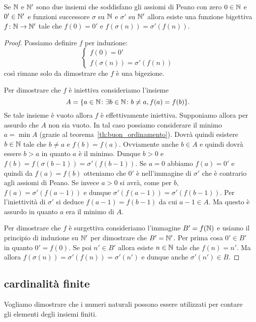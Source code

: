 \begin{theorem}
  \label{th:unicitaN}%
  Se ${\mathbb N}$ e ${\mathbb N}'$ sono due insiemi che soddisfano gli assiomi di Peano 
  con zero $0\in {\mathbb N}$ e $0'\in {\mathbb N}'$ e funzioni 
  successore $\sigma$ su ${\mathbb N}$ e $\sigma'$ su ${\mathbb N}'$ allora
  esiste una funzione bigettiva $f\colon {\mathbb N}\to {\mathbb N}'$ tale che 
  $f(0) = 0'$ e $f(\sigma(n)) = \sigma'(f(n))$.
\end{theorem}
%
\begin{proof}
Possiamo definire $f$ per induzione:
\[
\begin{cases}
  f(0) = 0' \\ 
  f(\sigma(n)) = \sigma'(f(n))
\end{cases}  
\]
così rimane solo da dimostrare che $f$ è una bigezione.

Per dimostrare che $f$ è iniettiva consideriamo l'insieme 
\[
  A={\left\{ a\in {\mathbb N}\colon \exists b\in {\mathbb N}\colon b\neq a, f(a)=f(b) \right\}}.
\]
Se tale insieme è vuoto allora $f$ è effettivamente iniettiva.
Supponiamo allora per assurdo che $A$ non sia vuoto.
In tal caso possiamo considerare il minimo $a=\min A$ 
(grazie al teorema~\ref{th:buon_ordinamento}).
Dovrà quindi esistere $b\in {\mathbb N}$ tale che $b\neq a$ e $f(b)=f(a)$.
Ovviamente anche $b\in A$ e quindi dovrà essere $b>a$ in quanto
$a$ è il minimo. Dunque $b>0$ e $f(b) = f(\sigma(b-1))
=\sigma'(f(b-1))$. Se $a=0$ abbiamo $f(a)=0'$ e quindi da $f(a)=f(b)$ 
otteniamo che $0'$ è nell'immagine di $\sigma'$ che è contrario 
agli assiomi di Peano. 
Se invece $a>0$ si avrà, come per $b$,
$f(a)=\sigma'(f(a-1))$ e dunque $\sigma'(f(a-1)) = \sigma'(f(b-1))$.
Per l'iniettività di $\sigma'$ si deduce $f(a-1)=f(b-1)$ da cui 
$a-1 \in A$. Ma questo è assurdo in quanto $a$ era il minimo di $A$.

Per dimostrare che $f$ è surgettiva consideriamo l'immagine 
$B'=f({\mathbb N})$ e usiamo il principio di induzione su ${\mathbb N}'$ 
per dimostrare che $B'={\mathbb N}'$.
Per prima cosa $0'\in B'$ in quanto $0'=f(0)$.
Se poi $n'\in B'$ allora esiste $n\in {\mathbb N}$ tale che $f(n)=n'$.
Ma allora $f(\sigma(n))=\sigma'(f(n))=\sigma'(n')$ 
e dunque anche $\sigma'(n')\in B$. 
\end{proof}

\subsection{cardinalità finite}

Vogliamo dimostrare che i numeri naturali possono essere utilizzati 
per contare gli elementi degli insiemi finiti.

